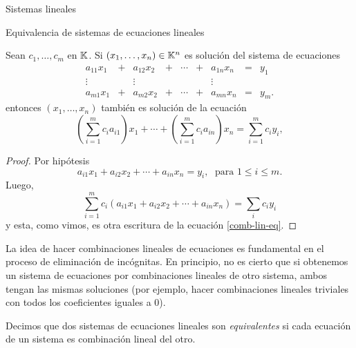 \begin{chapter}{Sistemas lineales}
\begin{section}{Equivalencia de sistemas de ecuaciones lineales}
            \begin{proposicion}\label{sist-impl}
                Sean $c_1,\ldots,c_m$ en $\mathbb K$. Si $(x_1,\ldots,x_n) \in \mathbb K^n$  es solución del sistema de ecuaciones
                \begin{equation*}
                \begin{matrix}
                a_{11}x_1& + &a_{12}x_2& + &\cdots& + &a_{1n}x_n &= &y_1\\
                \vdots&  &\vdots& &&  &\vdots \\
                a_{m1}x_1& + &a_{m2}x_2& + &\cdots& + &a_{mn}x_n &=&y_m.
                \end{matrix}
                \end{equation*}
                 entonces $(x_1,\ldots,x_n)$ también es solución de la ecuación
                 \begin{equation*}
                 \left(\sum_{i=1}^{m}c_{i}a_{i1}\right)x_1 + \cdots +  	\left(\sum_{i=1}^{m}c_{i}a_{in}\right)x_n = \sum_{i=1}^{m}	c_{i}y_{i},
                 \end{equation*}
            \end{proposicion}
            \begin{proof}
                Por hipótesis
                \begin{equation*}
                a_{i1}x_1 + a_{i2}x_2 + \cdots + a_{in}x_n = y_i,\; \text{ para } 1 \le i \le m.
                \end{equation*}
                Luego, 
                \begin{equation*}
                \sum_{i=1}^m c_i(a_{i1}x_1 + a_{i2}x_2 + \cdots + a_{in}x_n) = \sum_i c_iy_i
                \end{equation*}
                y  esta, como vimos, es otra escritura de la ecuación \eqref{comb-lin-eq}.
            \end{proof}
            
            La idea de hacer combinaciones lineales de ecuaciones es fundamental en el proceso de eliminación de incógnitas. En principio, no es cierto que si obtenemos un sistema de ecuaciones por combinaciones lineales de otro sistema, ambos tengan las mismas soluciones   (por ejemplo, hacer combinaciones lineales triviales con todos los coeficientes iguales a 0).
        
            \begin{definicion}
            Decimos que dos sistemas de ecuaciones lineales son \textit{equivalentes} si cada ecuación de un sistema es combinación lineal del otro.
            \end{definicion}
            

\end{section}
\end{chapter}
